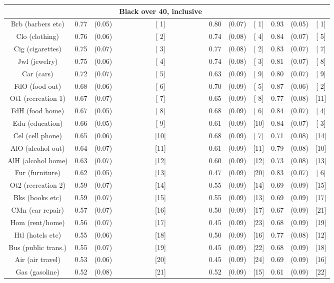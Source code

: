 \documentclass[a4paper,10pt]{article}
\begin{document}
\begin{tabular}{cccccccccc}
\hline \hline
 & & & \textbf{Black over 40, inclusive} & & & & & \\
\hline
Brb (barbers etc)&0.77&(0.05)&[ 1] & 0.80&(0.07)&[ 1] & 0.93 & (0.05) & [ 1] \\
Clo (clothing)&0.76&(0.06)&[ 2] & 0.74&(0.08)&[ 4] & 0.84 & (0.07) & [ 5] \\
Cig (cigarettes)&0.75&(0.07)&[ 3] & 0.77&(0.08)&[ 2] & 0.83 & (0.07) & [ 7] \\
Jwl (jewelry)&0.75&(0.06)&[ 4] & 0.74&(0.08)&[ 3] & 0.81 & (0.07) & [ 8] \\
Car (cars)&0.72&(0.07)&[ 5] & 0.63&(0.09)&[ 9] & 0.80 & (0.07) & [ 9] \\
FdO (food out)&0.68&(0.06)&[ 6] & 0.70&(0.09)&[ 5] & 0.87 & (0.06) & [ 2] \\
Ot1 (recreation 1)&0.67&(0.07)&[ 7] & 0.65&(0.09)&[ 8] & 0.77 & (0.08) & [11] \\
FdH (food home)&0.67&(0.05)&[ 8] & 0.68&(0.09)&[ 6] & 0.84 & (0.07) & [ 4] \\
Edu (education)&0.66&(0.05)&[ 9] & 0.61&(0.09)&[10] & 0.84 & (0.07) & [ 3] \\
Cel (cell phone)&0.65&(0.06)&[10] & 0.68&(0.09)&[ 7] & 0.71 & (0.08) & [14] \\
AlO (alcohol out)&0.64&(0.07)&[11] & 0.61&(0.09)&[11] & 0.79 & (0.08) & [10] \\
AlH (alcohol home)&0.63&(0.07)&[12] & 0.60&(0.09)&[12] & 0.73 & (0.08) & [13] \\
Fur (furniture)&0.62&(0.05)&[13] & 0.47&(0.09)&[20] & 0.83 & (0.07) & [ 6] \\
Ot2 (recreation 2)&0.59&(0.07)&[14] & 0.55&(0.09)&[14] & 0.69 & (0.09) & [15] \\
Bks (books etc)&0.59&(0.07)&[15] & 0.55&(0.09)&[13] & 0.69 & (0.09) & [17] \\
CMn (car repair)&0.57&(0.07)&[16] & 0.50&(0.09)&[17] & 0.67 & (0.09) & [21] \\
Hom (rent/home)&0.56&(0.07)&[17] & 0.45&(0.09)&[23] & 0.68 & (0.09) & [19] \\
Htl (hotels etc)&0.55&(0.06)&[18] & 0.50&(0.09)&[16] & 0.77 & (0.08) & [12] \\
Bus (public trans.)&0.55&(0.07)&[19] & 0.45&(0.09)&[22] & 0.68 & (0.09) & [18] \\
Air (air travel)&0.53&(0.06)&[20] & 0.45&(0.09)&[24] & 0.69 & (0.09) & [16] \\
Gas (gasoline)&0.52&(0.08)&[21] & 0.52&(0.09)&[15] & 0.61 & (0.09) & [22] \\

\end{tabular}
\end{document}
